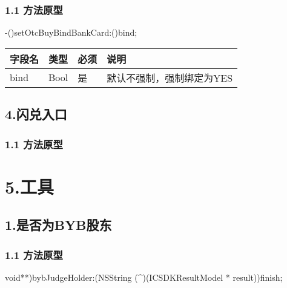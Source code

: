 \documentclass[letterpaper,10pt,english]{sphinxmanual}
\begin{document}
\subsubsection{1.1 方法原型}
\label{\detokenize{BCBWalletSDK_u63a5_u53e3_u8bf4_u660e:id83}}
-()setOtcBuyBindBankCard:()bind;



\begin{savenotes}\sphinxattablestart
\centering
\begin{tabulary}{\linewidth}[t]{|T|T|T|T|}
\hline
\sphinxstyletheadfamily 
字段名
&\sphinxstyletheadfamily 
类型
&\sphinxstyletheadfamily 
必须
&\sphinxstyletheadfamily 
说明
\\
\hline
bind
&
Bool
&
是
&
默认不强制，强制绑定为YES
\\
\hline
\end{tabulary}
\par
\sphinxattableend\end{savenotes}


\subsection{4.闪兑入口}
\label{\detokenize{BCBWalletSDK_u63a5_u53e3_u8bf4_u660e:id84}}

\subsubsection{1.1 方法原型}
\label{\detokenize{BCBWalletSDK_u63a5_u53e3_u8bf4_u660e:id85}}


\section{5.工具}
\label{\detokenize{BCBWalletSDK_u63a5_u53e3_u8bf4_u660e:id86}}

\subsection{1.是否为BYB股东}
\label{\detokenize{BCBWalletSDK_u63a5_u53e3_u8bf4_u660e:byb}}

\subsubsection{1.1 方法原型}
\label{\detokenize{BCBWalletSDK_u63a5_u53e3_u8bf4_u660e:id87}}
\sphinxstylestrong{-(}void**)bybJudgeHolder:(NSString (\textasciicircum{})(ICSDKResultModel * result))finish;
\end{document}
